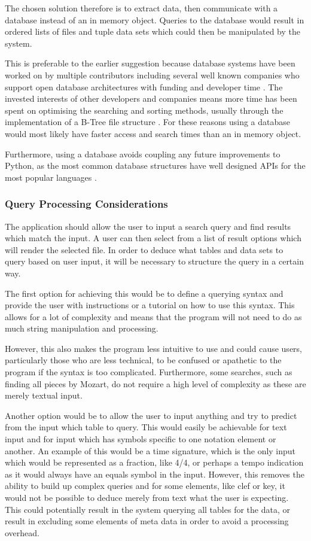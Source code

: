 The chosen solution therefore is to extract data, then communicate with a database instead of an in memory object. Queries to the database would result in ordered lists of files and tuple data sets which could then be manipulated by the system. 

This is preferable to the earlier suggestion because database systems have been worked on by multiple contributors including several well known companies who support open database architectures with funding and developer time \parencite{SQLiteConsortium}. The invested interests of other developers and companies means more time has been spent on optimising the searching and sorting methods, usually through the implementation of a B-Tree file structure \parencite{SQLiteBTree}. For these reasons using a database would most likely have faster access and search times than an in memory object.

Furthermore, using a database avoids coupling any future improvements to Python, as the most common database structures have well designed APIs for the most popular languages \parencite{MySQLAPI}.


\subsubsection{Query Processing Considerations}
The application should allow the user to input a search query and find results which match the input. A user can then select from a list of result options which will render the selected file. In order to deduce what tables and data sets to query based on user input, it will be necessary to structure the query in a certain way.

The first option for achieving this would be to define a querying syntax and provide the user with instructions or a tutorial on how to use this syntax. This allows for a lot of complexity and means that the program will not need to do as much string manipulation and processing.

However, this also makes the program less intuitive to use and could cause users, particularly those who are less technical, to be confused or apathetic to the program if the syntax is too complicated. Furthermore, some searches, such as finding all pieces by Mozart, do not require a high level of complexity as these are merely textual input.

Another option would be to allow the user to input anything and try to predict from the input which table to query. This would easily be achievable for text input and for input which has symbols specific to one notation element or another. An example of this would be a time signature, which is the only input which would be represented as a fraction, like 4/4, or perhaps a tempo indication as it would always have an equals symbol in the input.
However, this removes the ability to build up complex queries and for some elements, like clef or key, it would not be possible to deduce merely from text what the user is expecting. This could potentially result in the system querying all tables for the data, or result in excluding some elements of meta data in order to avoid a processing overhead.

